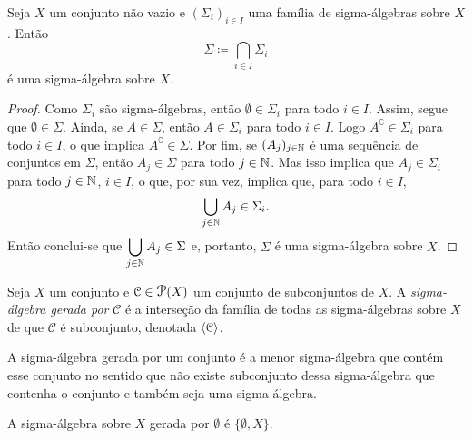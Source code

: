 \begin{prop}
Seja $X$ um conjunto não vazio e $(\Sigma_i)_{i \in I}$ uma família de sigma-álgebras sobre $X$. Então
	\begin{equation*}
	\Sigma \coloneqq \bigcap_{i \in I} \Sigma_i
	\end{equation*}
é uma sigma-álgebra sobre $X$.
\end{prop}
\begin{proof}
	Como $\Sigma_i$ são sigma-álgebras, então $\emptyset \in \Sigma_i$ para todo $i \in I$. Assim, segue que $\emptyset \in \Sigma$. Ainda, se $A \in \Sigma$, então $A \in \Sigma_i$ para todo $i \in I$. Logo $A^\complement \in \Sigma_i$ para todo $i \in I$, o que implica $A^\complement \in \Sigma$. Por fim, se $(A_j)_{j \in \mathbb{N}}$ é uma sequência de conjuntos em $\Sigma$, então $A_j \in \Sigma$ para todo $j \in \mathbb{N}$. Mas isso implica que $A_j \in \Sigma_i$ para todo $j \in \mathbb{N}$, $i \in I$, o que, por sua vez, implica que, para todo $i \in I$,
	\begin{equation*}
	\bigcup_{j \in \mathbb{N}} A_j \in \Sigma_i.
	\end{equation*}
Então conclui-se que $\displaystyle\bigcup_{j \in \mathbb{N}} A_j \in \Sigma$ e, portanto, $\Sigma$ é uma sigma-álgebra sobre $X$.
\end{proof}

\begin{defi}
Seja $X$ um conjunto e $\mathcal C \in \p(X)$ um conjunto de subconjuntos de $X$. A \emph{sigma-álgebra gerada por} $\mathcal C$ é a interseção da família de todas as sigma-álgebras sobre $X$ de que $\mathcal C$ é subconjunto, denotada $\left\langle \mathcal C \right\rangle$.
\end{defi}
	
	A sigma-álgebra gerada por um conjunto é a menor sigma-álgebra que contém esse conjunto no sentido que não existe subconjunto dessa sigma-álgebra que contenha o conjunto e também seja uma sigma-álgebra.

\begin{ex}
	A sigma-álgebra sobre $X$ gerada por $\emptyset$ é $\{\emptyset, X\}$.
\end{ex}


